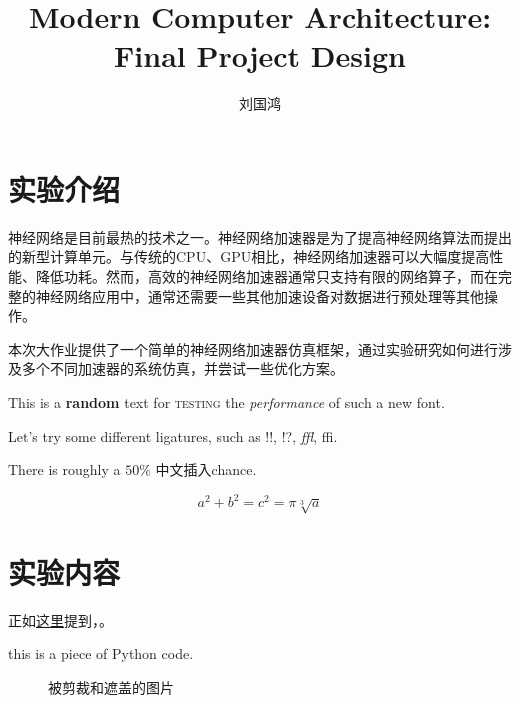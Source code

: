 \documentclass[texList,hyper]{TexHU}
\title{Modern Computer Architecture: Final Project Design}
\author{刘国鸿}
\begin{document}
\maketitle
\section{实验介绍}\label{sec:01}

神经网络是目前最热的技术之一。神经网络加速器是为了提高神经网络算法而提出的新型计算单元。与传统的CPU、GPU相比，神经网络加速器可以大幅度提高性能、降低功耗。然而，高效的神经网络加速器通常只支持有限的网络算子，而在完整的神经网络应用中，通常还需要一些其他加速设备对数据进行预处理等其他操作。

本次大作业提供了一个简单的神经网络加速器仿真框架，通过实验研究如何进行涉及多个不同加速器的系统仿真，并尝试一些优化方案。


This is a \textbf{random} text for \textsc{testing} the \textit{performance} of such a new font.

Let's try some different ligatures, such as !!, !?, \textit{ffl}, ffi.

There is roughly a \(50\%\) 中文插入chance.

\[a^2+b^2=c^2=\pi\sqrt[3]{a}\]

\sectionDivider
\section{实验内容}
正如\hyperref[sec:01]{这里}提到，。
\begin{texList}
    this is a piece of Python code.
\end{texList}


\begin{figure}
    \centering
    \caption{被剪裁和遮盖的图片}
  \end{figure}
  
\end{document}
